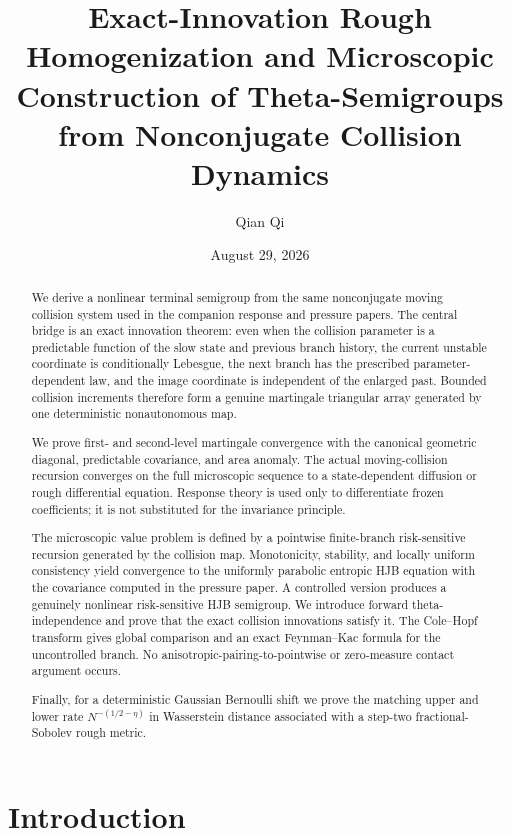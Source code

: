 \documentclass[11pt,reqno]{amsart}
\title[Exact-innovation homogenization and theta semigroups]{Exact-Innovation Rough Homogenization and Microscopic Construction of Theta-Semigroups from Nonconjugate Collision Dynamics}
\author{Qian Qi}
\date{August 29, 2026}
\theoremstyle{definition}
\theoremstyle{remark}
\begin{document}
\begin{abstract}
We derive a nonlinear terminal semigroup from the same nonconjugate moving
collision system used in the companion response and pressure papers.  The
central bridge is an exact innovation theorem: even when the collision
parameter is a predictable function of the slow state and previous branch
history, the current unstable coordinate is conditionally Lebesgue, the next
branch has the prescribed parameter-dependent law, and the image coordinate is
independent of the enlarged past.  Bounded collision increments therefore form
a genuine martingale triangular array generated by one deterministic
nonautonomous map.

We prove first- and second-level martingale convergence with the canonical
geometric diagonal, predictable covariance, and area anomaly.  The actual
moving-collision recursion converges on the full microscopic sequence to a
state-dependent diffusion or rough differential equation.  Response theory is
used only to differentiate frozen coefficients; it is not substituted for the
invariance principle.

The microscopic value problem is defined by a pointwise finite-branch
risk-sensitive recursion generated by the collision map.  Monotonicity,
stability, and locally uniform consistency yield convergence to the uniformly
parabolic entropic HJB equation with the covariance computed in the pressure
paper.  A controlled version produces a genuinely nonlinear risk-sensitive
HJB semigroup.  We introduce forward theta-independence and prove that the
exact collision innovations satisfy it.  The Cole--Hopf transform gives global
comparison and an exact Feynman--Kac formula for the uncontrolled branch.  No
anisotropic-pairing-to-pointwise or zero-measure contact argument occurs.

Finally, for a deterministic Gaussian Bernoulli shift we prove the matching
upper and lower rate $N^{-(1/2-\eta)}$ in Wasserstein distance associated with
a step-two fractional-Sobolev rough metric.
\end{abstract}

\maketitle
\tableofcontents

\section{Introduction}
\end{document}
